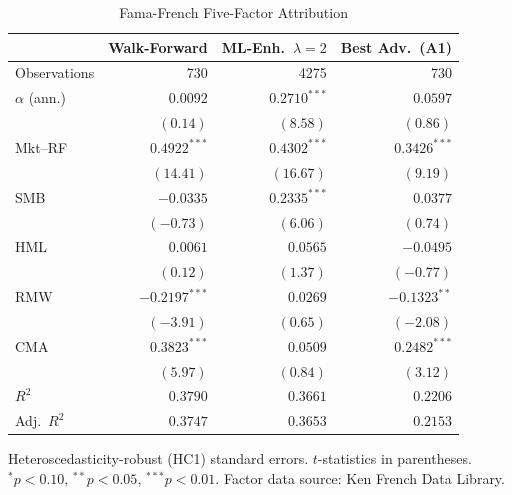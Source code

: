 \begin{table}[htbp]
\centering
\caption{Fama-French Five-Factor Attribution}
\label{tab:factor_attribution}
\small
\begin{tabular}{lrrr}
\toprule
 & Walk-Forward & ML-Enh.\ $\lambda{=}2$ & Best Adv.\ (A1) \\
\midrule
Observations & 730 & 4275 & 730 \\
\midrule
$\alpha$ (ann.) & $0.0092$ & $0.2710^{***}$ & $0.0597$ \\
 & $(0.14)$ & $(8.58)$ & $(0.86)$ \\
\midrule
Mkt--RF & $0.4922^{***}$ & $0.4302^{***}$ & $0.3426^{***}$ \\
 & $(14.41)$ & $(16.67)$ & $(9.19)$ \\
SMB & $-0.0335$ & $0.2335^{***}$ & $0.0377$ \\
 & $(-0.73)$ & $(6.06)$ & $(0.74)$ \\
HML & $0.0061$ & $0.0565$ & $-0.0495$ \\
 & $(0.12)$ & $(1.37)$ & $(-0.77)$ \\
RMW & $-0.2197^{***}$ & $0.0269$ & $-0.1323^{**}$ \\
 & $(-3.91)$ & $(0.65)$ & $(-2.08)$ \\
CMA & $0.3823^{***}$ & $0.0509$ & $0.2482^{***}$ \\
 & $(5.97)$ & $(0.84)$ & $(3.12)$ \\
\midrule
$R^2$ & $0.3790$ & $0.3661$ & $0.2206$ \\
Adj.\ $R^2$ & $0.3747$ & $0.3653$ & $0.2153$ \\
\bottomrule
\end{tabular}
\par\smallskip\footnotesize
Heteroscedasticity-robust (HC1) standard errors. $t$-statistics in parentheses.
$^{*}p<0.10$, $^{**}p<0.05$, $^{***}p<0.01$.
Factor data source: Ken French Data Library.
\end{table}